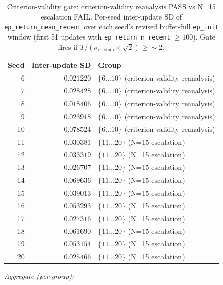 \documentclass{article}
\newcommand{\code}[1]{\texttt{#1}}
\begin{document}
\begin{table}[!ht]
\centering
\caption{Criterion-validity gate: criterion-validity reanalysis PASS vs N=15 escalation FAIL. Per-seed inter-update SD of \code{ep\_return\_mean\_recent} over each seed's revised buffer-full \code{ep\_init} window (first 51 updates with \code{ep\_return\_n\_recent} $\geq 100$). Gate fires if $T / (\sigma_\mathrm{median} \times \sqrt{2}) \geq \sim 2$.}
\label{tab:2}
\small
\begin{tabular}{@{}rrl@{}}
\toprule
Seed & Inter-update SD & Group \\
\midrule
6  & $0.021220$ & $\{6 \ldots 10\}$ (criterion-validity reanalysis) \\
7  & $0.028428$ & $\{6 \ldots 10\}$ (criterion-validity reanalysis) \\
8  & $0.018406$ & $\{6 \ldots 10\}$ (criterion-validity reanalysis) \\
9  & $0.023918$ & $\{6 \ldots 10\}$ (criterion-validity reanalysis) \\
10 & $0.078524$ & $\{6 \ldots 10\}$ (criterion-validity reanalysis) \\
11 & $0.030381$ & $\{11 \ldots 20\}$ (N=15 escalation) \\
12 & $0.033319$ & $\{11 \ldots 20\}$ (N=15 escalation) \\
13 & $0.026707$ & $\{11 \ldots 20\}$ (N=15 escalation) \\
14 & $0.069636$ & $\{11 \ldots 20\}$ (N=15 escalation) \\
15 & $0.039013$ & $\{11 \ldots 20\}$ (N=15 escalation) \\
16 & $0.053293$ & $\{11 \ldots 20\}$ (N=15 escalation) \\
17 & $0.027316$ & $\{11 \ldots 20\}$ (N=15 escalation) \\
18 & $0.061690$ & $\{11 \ldots 20\}$ (N=15 escalation) \\
19 & $0.053154$ & $\{11 \ldots 20\}$ (N=15 escalation) \\
20 & $0.025466$ & $\{11 \ldots 20\}$ (N=15 escalation) \\
\bottomrule
\end{tabular}

\vspace{1em}

\textit{Aggregate (per group):}

\vspace{0.5em}


\end{table}
\end{document}
